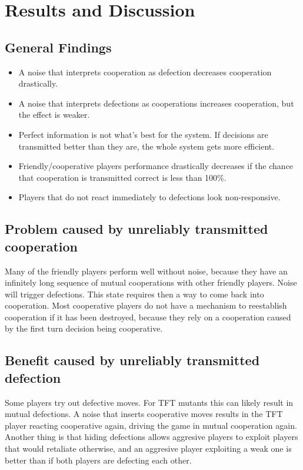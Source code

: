 \section{Results and Discussion}

\subsection{General Findings}

\begin{itemize}
	\item A noise that interprets cooperation as defection decreases cooperation drastically.
	\item A noise that interprets defections as cooperations increases cooperation, but the effect is weaker.
	\item Perfect information is not what’s best for the system. If decisions are transmitted better than they are, the whole system gets more efficient.
	\item Friendly/cooperative players performance drastically decreases if the chance that cooperation is transmitted correct is less than 100\%.
	\item Players that do not react immediately to defections look non-responsive.
\end{itemize}

\subsection{Problem caused by unreliably transmitted cooperation}
Many of the friendly players perform well without noise, because they have an infinitely long sequence of mutual cooperations with other friendly players. Noise will trigger defections. This state requires then a way to come back into cooperation. Most cooperative players do not have a mechanism to reestablish cooperation if it has been destroyed, because they rely on a cooperation caused by the first turn decision being cooperative. 

\subsection{Benefit caused by unreliably transmitted defection}
Some players try out defective moves. For TFT mutants this can likely result in mutual defections. A noise that inserts cooperative moves results in the TFT player reacting cooperative again, driving the game in mutual cooperation again. Another thing is that hiding defections allows aggresive players to exploit players that would retaliate otherwise, and an aggresive player exploiting a weak one is better than if both players are defecting each other.

